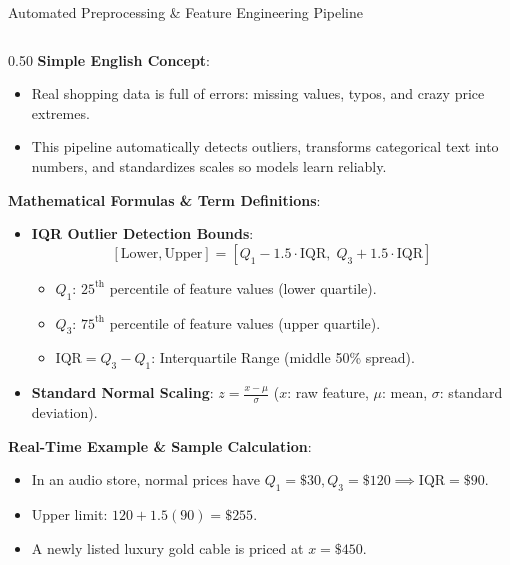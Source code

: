 \documentclass[10pt]{beamer}
\begin{document}
\begin{frame}[fragile]{Automated Preprocessing \& Feature Engineering Pipeline}
\begin{columns}[T]
    \begin{column}{0.50\textwidth}
        {\color{brandred}\textbf{Simple English Concept}}:
        \begin{itemize}\scriptsize
            \item Real shopping data is full of errors: missing values, typos, and crazy price extremes.
            \item This pipeline automatically detects outliers, transforms categorical text into numbers, and standardizes scales so models learn reliably.
        \end{itemize}
        {\color{brandorange}\textbf{Mathematical Formulas \& Term Definitions}}:
        \begin{itemize}\scriptsize
            \item \textbf{IQR Outlier Detection Bounds}:
            $$[\text{Lower}, \text{Upper}] = [Q_1 - 1.5 \cdot \text{IQR}, \; Q_3 + 1.5 \cdot \text{IQR}]$$
            \begin{itemize}\tiny
                \item $Q_1$: $25^{\text{th}}$ percentile of feature values (lower quartile).
                \item $Q_3$: $75^{\text{th}}$ percentile of feature values (upper quartile).
                \item $\text{IQR} = Q_3 - Q_1$: Interquartile Range (middle 50\% spread).
            \end{itemize}
            \item \textbf{Standard Normal Scaling}: $z = \frac{x - \mu}{\sigma}$ ($x$: raw feature, $\mu$: mean, $\sigma$: standard deviation).
        \end{itemize}
        {\color{brandred}\textbf{Real-Time Example \& Sample Calculation}}:
        \begin{itemize}\scriptsize
            \item In an audio store, normal prices have $Q_1 = \$30, Q_3 = \$120 \implies \text{IQR} = \$90$.
            \item Upper limit: $120 + 1.5(90) = \$255$.
            \item A newly listed luxury gold cable is priced at $x = \$450$.

\end{itemize}
\end{column}
\end{columns}
\end{frame}
\end{document}
